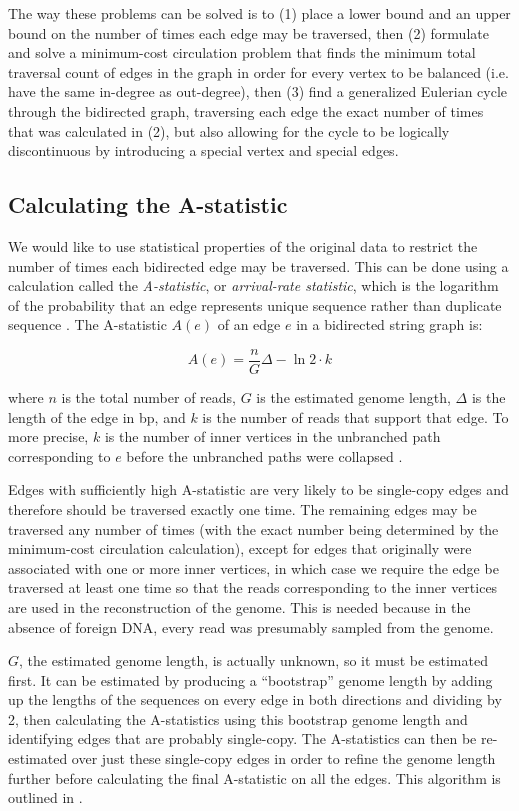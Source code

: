 \documentclass[10pt]{article}
\newcommand{\KeyTerm}[1]{{\it #1}}
\begin{document}
The way these problems can be solved is to (1) place a lower bound and an upper
bound on the number of times each edge may be traversed, then (2) formulate and
solve a minimum-cost circulation problem that finds the minimum total traversal
count of edges in the graph in order for every vertex to be balanced (i.e. have
the same in-degree as out-degree), then (3) find a generalized Eulerian cycle
through the bidirected graph, traversing each edge the exact number of times
that was calculated in (2), but also allowing for the cycle to be logically
discontinuous by introducing a special vertex and special edges.

\subsection{Calculating the A-statistic}

\label{subsec:a_statistics}

We would like to use statistical properties of the original data to restrict the
number of times each bidirected edge may be traversed.  This can be done using a
calculation called the \KeyTerm{A-statistic}, or \KeyTerm{arrival-rate
statistic}, which is the logarithm of the probability that an edge represents
unique sequence rather than duplicate sequence \cite{Myers2005}.  The
A-statistic $A(e)$ of an edge $e$ in a bidirected string graph is:

\[ A(e) = \frac{n}{G} \Delta - \ln{2} \cdot {k} \]

where $n$ is the total number of reads, $G$ is the estimated genome length,
$\Delta$ is the length of the edge in bp, and $k$ is the number of reads that
support that edge.  To more precise, $k$ is the number of inner vertices in the
unbranched path corresponding to $e$ before the unbranched paths were collapsed
\cite{Myers2005}.

Edges with sufficiently high A-statistic are very likely to be single-copy edges
and therefore should be traversed exactly one time.  The remaining edges may be
traversed any number of times (with the exact number being determined by the
minimum-cost circulation calculation), except for edges that originally were
associated with one or more inner vertices, in which case we require the edge be
traversed at least one time so that the reads corresponding to the inner
vertices are used in the reconstruction of the genome.  This is needed because
in the absence of foreign DNA, every read was presumably sampled from the
genome.

$G$, the estimated genome length, is actually unknown, so it must be estimated
first.  It can be estimated by producing a ``bootstrap'' genome length by adding
up the lengths of the sequences on every edge in both directions and dividing by
2, then calculating the A-statistics using this bootstrap genome length and
identifying edges that are probably single-copy.  The A-statistics can then be
re-estimated over just these single-copy edges in order to refine the genome
length further before calculating the final A-statistic on all the edges.  This
algorithm is outlined in \cite{Myers2005}.
\end{document}
